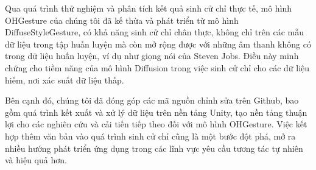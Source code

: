 Qua quá trình thử nghiệm và phân tích kết quả sinh cử chỉ thực tế, mô hình OHGesture của chúng tôi đã kế thừa và phát triển từ mô hình DiffuseStyleGesture, có khả năng sinh cử chỉ chân thực, không chỉ trên các mẫu dữ liệu trong tập huấn luyện mà còn mở rộng được với những âm thanh không có trong dữ liệu huấn luyện, ví dụ như giọng nói của Steven Jobs. Điều này minh chứng cho tiềm năng của mô hình Diffusion trong việc sinh cử chỉ cho các dữ liệu hiếm, nơi xác suất dữ liệu thấp.

Bên cạnh đó, chúng tôi đã đóng góp các mã nguồn chỉnh sửa trên Github, bao gồm quá trình kết xuất và xử lý dữ liệu trên nền tảng Unity, tạo nền tảng thuận lợi cho các nghiên cứu và cải tiến tiếp theo đối với mô hình OHGesture. Việc kết hợp thêm văn bản vào quá trình sinh cử chỉ cũng là một bước đột phá, mở ra nhiều hướng phát triển ứng dụng trong các lĩnh vực yêu cầu tương tác tự nhiên và hiệu quả hơn.


%
%



%

